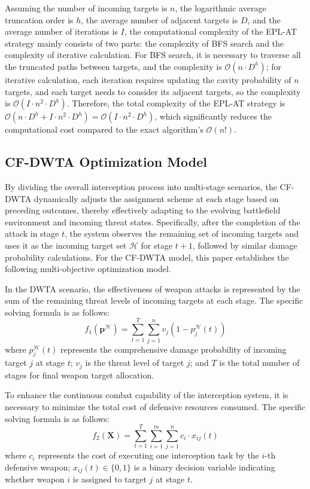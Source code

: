\documentclass[lettersize,journal]{IEEEtran}
\begin{document}
Assuming the number of incoming targets is $n$, the logarithmic average truncation order is $h$, the average number of adjacent targets is $D$, and the average number of iterations is $I$, the computational complexity of the EPL-AT strategy mainly consists of two parts: the complexity of BFS search and the complexity of iterative calculation. For BFS search, it is necessary to traverse all the truncated paths between targets, and the complexity is $\mathcal{O}(n \cdot D^h)$; for iterative calculation, each iteration requires updating the cavity probability of $n$ targets, and each target needs to consider its adjacent targets, so the complexity is $\mathcal{O}(I \cdot n^2 \cdot D^h)$. Therefore, the total complexity of the EPL-AT strategy is $\mathcal{O}(n \cdot D^h + I \cdot n^2 \cdot D^h) = \mathcal{O}(I \cdot n^2 \cdot D^h)$, which significantly reduces the computational cost compared to the exact algorithm's $\mathcal{O}(n!)$.


\subsection{CF-DWTA Optimization Model} 

By dividing the overall interception process into multi-stage scenarios, the CF-DWTA dynamically adjusts the assignment scheme at each stage based on preceding outcomes, thereby effectively adapting to the evolving battlefield environment and incoming threat states. Specifically, after the completion of the attack in stage $t$, the system observes the remaining set of incoming targets and uses it as the incoming target set $\mathcal{H}$ for stage $t+1$, followed by similar damage probability calculations. For the CF-DWTA model, this paper establishes the following multi-objective optimization model.

In the DWTA scenario, the effectiveness of weapon attacks is represented by the sum of the remaining threat levels of incoming targets at each stage. The specific solving formula is as follows:
\begin{equation}
\label{eq:obj1}
    f_1(\boldsymbol{p}^{\mathcal{H}}) = \sum_{t=1}^{T}{\sum_{j=1}^{n}{v_j(1 - p_j^{\mathcal{H}}(t))}}
\end{equation}
where $p_j^{\mathcal{H}}(t)$ represents the comprehensive damage probability of incoming target $j$ at stage $t$; $v_j$ is the threat level of target $j$; and $T$ is the total number of stages for final weapon target allocation.

To enhance the continuous combat capability of the interception system, it is necessary to minimize the total cost of defensive resources consumed. The specific solving formula is as follows:
\begin{equation}
\label{eq:obj2}
    f_2(\mathbf{X}) =  \sum_{t=1}^{T}{\sum_{i=1}^{m} \sum_{j=1}^{n} c_i \cdot x_{ij}(t)}
\end{equation}
where $c_i$ represents the cost of executing one interception task by the $i$-th defensive weapon; $x_{ij}(t) \in \{0,1\}$ is a binary decision variable indicating whether weapon $i$ is assigned to target $j$ at stage $t$.
\end{document}
